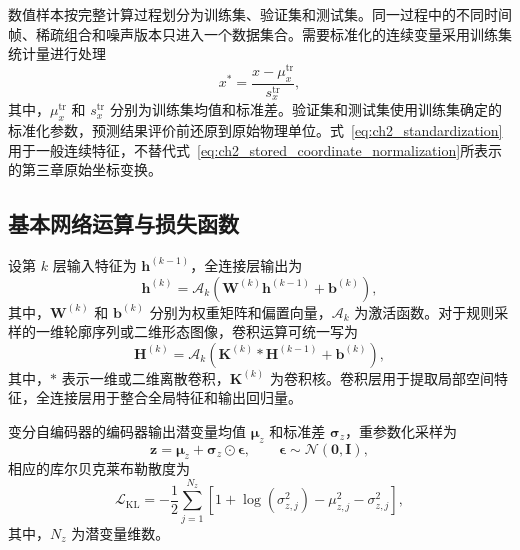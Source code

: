 数值样本按完整计算过程划分为训练集、验证集和测试集。同一过程中的不同时间帧、稀疏组合和噪声版本只进入一个数据集合。需要标准化的连续变量采用训练集统计量进行处理
\begin{equation}
x^{*}
=
\frac{x-\mu_x^{\mathrm{tr}}}{s_x^{\mathrm{tr}}},
\label{eq:ch2_standardization}
\end{equation}
其中，$\mu_x^{\mathrm{tr}}$ 和 $s_x^{\mathrm{tr}}$ 分别为训练集均值和标准差。验证集和测试集使用训练集确定的标准化参数，预测结果评价前还原到原始物理单位。式~\eqref{eq:ch2_standardization}用于一般连续特征，不替代式~\eqref{eq:ch2_stored_coordinate_normalization}所表示的第三章原始坐标变换。

\subsection{基本网络运算与损失函数}

设第 $k$ 层输入特征为 $\boldsymbol{h}^{(k-1)}$，全连接层输出为
\begin{equation}
\boldsymbol{h}^{(k)}
=
\mathcal{A}_k
\left(
\boldsymbol{W}^{(k)}\boldsymbol{h}^{(k-1)}
+
\boldsymbol{b}^{(k)}
\right),
\label{eq:ch2_fully_connected_layer}
\end{equation}
其中，$\boldsymbol{W}^{(k)}$ 和 $\boldsymbol{b}^{(k)}$ 分别为权重矩阵和偏置向量，$\mathcal{A}_k$ 为激活函数。对于规则采样的一维轮廓序列或二维形态图像，卷积运算可统一写为
\begin{equation}
\boldsymbol{H}^{(k)}
=
\mathcal{A}_k
\left(
\boldsymbol{K}^{(k)}*\boldsymbol{H}^{(k-1)}
+
\boldsymbol{b}^{(k)}
\right),
\label{eq:ch2_convolution}
\end{equation}
其中，$*$ 表示一维或二维离散卷积，$\boldsymbol{K}^{(k)}$ 为卷积核。卷积层用于提取局部空间特征，全连接层用于整合全局特征和输出回归量。

变分自编码器的编码器输出潜变量均值 $\boldsymbol{\mu}_z$ 和标准差 $\boldsymbol{\sigma}_z$，重参数化采样为
\begin{equation}
\boldsymbol{z}
=
\boldsymbol{\mu}_z
+
\boldsymbol{\sigma}_z\odot\boldsymbol{\epsilon},
\qquad
\boldsymbol{\epsilon}\sim\mathcal{N}(\boldsymbol{0},\boldsymbol{I}),
\label{eq:ch2_vae_reparameterization}
\end{equation}
相应的库尔贝克莱布勒散度为
\begin{equation}
\mathcal{L}_{\mathrm{KL}}
=
-\frac{1}{2}
\sum_{j=1}^{N_z}
\left[
1+\log\left(\sigma_{z,j}^2\right)
-\mu_{z,j}^2
-\sigma_{z,j}^2
\right],
\label{eq:ch2_vae_kl}
\end{equation}
其中，$N_z$ 为潜变量维数\cite{kingma2014vae}。

